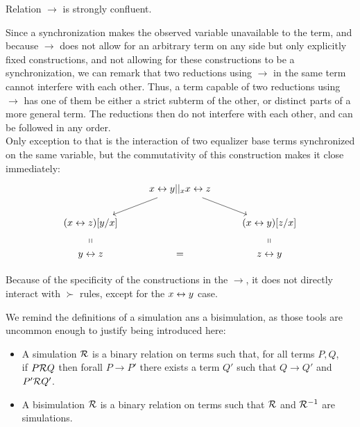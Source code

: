 \begin{proposition}
Relation $\to$ is strongly confluent.
\end{proposition}

\begin{myproof}
Since a synchronization makes the observed variable unavailable to the term, and because $\to$ does not allow for an arbitrary term on any side but only explicitly fixed constructions, and not allowing for these constructions to be a synchronization, we can remark that two reductions using $\to$ in the same term cannot interfere with each other. Thus, a term capable of two reductions using $\to$ has one of them be either a strict subterm of the other, or distinct parts of a more general term. The reductions then do not interfere with each other, and can be followed in any order.\\
Only exception to that is the interaction of two equalizer base terms synchronized on the same variable, but the commutativity of this construction makes it close immediately:\\
\[\begin{tikzcd}
& x\tto y ||_x x\tto z \arrow[dl] \arrow[dr] &\\
(x\tto z)[y/x]\arrow[d, phantom, "\shortparallel"] & & (x\tto y)[z/x]\arrow[d, phantom, "\shortparallel"]\\
y\tto z & = & z\tto y
\end{tikzcd}\]
\end{myproof}

Because of the specificity of the constructions in the $\to$, it does not directly interact with $\succ$ rules, except for the $x\leftrightarrow y$ case.

We remind the definitions of a simulation ans a bisimulation, as those tools are uncommon enough to justify being introduced here:

\begin{definition}
\begin{itemize}
	\item A simulation $\mathcal{R}$ is a binary relation on terms such that, for all terms $P,Q$,\\
		if $P \mathcal{R} Q$ then forall $P \to P'$ there exists a term $Q'$ such that $Q \to Q'$ and $P' \mathcal{R} Q'$.
	\item A bisimulation $\mathcal{R}$ is a binary relation on terms such that $\mathcal{R}$ and $\mathcal{R}^{-1}$ are simulations.
\end{itemize}
\end{definition}

